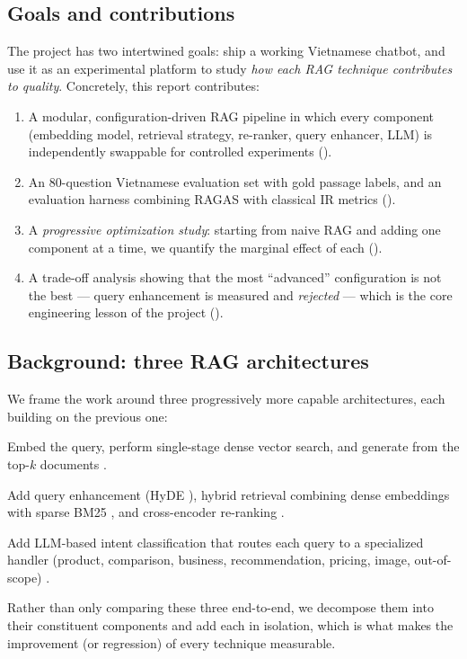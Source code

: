 \subsection{Goals and contributions}
The project has two intertwined goals: ship a working Vietnamese chatbot, and
use it as an experimental platform to study \emph{how each RAG technique
contributes to quality}. Concretely, this report contributes:
\begin{enumerate}[leftmargin=1.4em,itemsep=2pt]
  \item A modular, configuration-driven RAG pipeline in which every component
        (embedding model, retrieval strategy, re-ranker, query enhancer, LLM)
        is independently swappable for controlled experiments
        ().
  \item An 80-question Vietnamese evaluation set with gold passage labels, and
        an evaluation harness combining RAGAS \cite{es2023ragas} with classical
        IR metrics ().
  \item A \emph{progressive optimization study}: starting from naive RAG and
        adding one component at a time, we quantify the marginal effect of each
        ().
  \item A trade-off analysis showing that the most ``advanced'' configuration is
        not the best --- query enhancement is measured and \emph{rejected} ---
        which is the core engineering lesson of the project
        ().
\end{enumerate}

\subsection{Background: three RAG architectures}
We frame the work around three progressively more capable architectures, each
building on the previous one:
\begin{description}[leftmargin=1.6em,style=nextline,itemsep=3pt]
  \item[Naive RAG (baseline).] Embed the query, perform single-stage dense
        vector search, and generate from the top-$k$ documents
        \cite{lewis2020rag}.
  \item[Advanced RAG.] Add query enhancement (HyDE \cite{gao2023hyde}), hybrid
        retrieval combining dense embeddings with sparse BM25
        \cite{robertson2009bm25}, and cross-encoder re-ranking
        \cite{nogueira2019passage}.
  \item[Agentic RAG.] Add LLM-based intent classification that routes each query
        to a specialized handler (product, comparison, business,
        recommendation, pricing, image, out-of-scope) \cite{gao2023survey,
        asai2023selfrag}.
\end{description}
Rather than only comparing these three end-to-end, we decompose them into their
constituent components and add each in isolation, which is what makes the
improvement (or regression) of every technique measurable.
